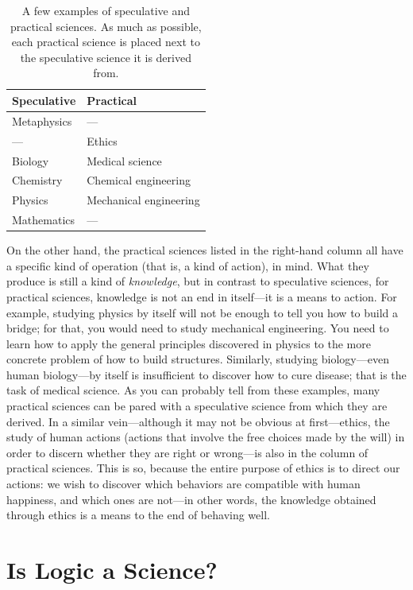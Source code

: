 \documentclass[
  12pt,
]{memoir}
\begin{document}
\begin{table}[ht]
\begin{center}
\caption{A few examples of speculative and practical sciences. As much as possible, each practical science is placed next to the speculative science it is derived from.}
\label{tab:table1}
\begin{tabular}{l|l}
\toprule
Speculative & Practical \\
\midrule
Metaphysics & — \\
—           & Ethics \\
Biology     & Medical science \\
Chemistry   & Chemical engineering \\
Physics     & Mechanical engineering \\
Mathematics & — \\
\bottomrule
\end{tabular}
\end{center}
\end{table}

On the other hand, the practical sciences listed in the right-hand
column all have a specific kind of operation (that is, a kind of
action), in mind. What they produce is still a kind of \emph{knowledge},
but in contrast to speculative sciences, for practical sciences,
knowledge is not an end in itself---it is a means to action. For
example, studying physics by itself will not be enough to tell you how
to build a bridge; for that, you would need to study mechanical
engineering. You need to learn how to apply the general principles
discovered in physics to the more concrete problem of how to build
structures. Similarly, studying biology---even human biology---by itself
is insufficient to discover how to cure disease; that is the task of
medical science. As you can probably tell from these examples, many
practical sciences can be pared with a speculative science from which
they are derived. In a similar vein---although it may not be obvious at
first---ethics, the study of human actions (actions that involve the
free choices made by the will) in order to discern whether they are
right or wrong---is also in the column of practical sciences. This is
so, because the entire purpose of ethics is to direct our actions: we
wish to discover which behaviors are compatible with human happiness,
and which ones are not---in other words, the knowledge obtained through
ethics is a means to the end of behaving well.

\section{Is Logic a Science?}\label{is-logic-a-science}
\end{document}
